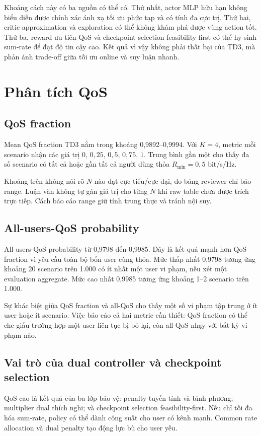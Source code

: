 Khoảng cách này có ba nguồn có thể có. Thứ nhất, actor MLP hữu hạn không biểu diễn được chính xác ánh xạ tối ưu phức tạp và có tính đa cực trị. Thứ hai, critic approximation và exploration có thể không khám phá được vùng action tốt. Thứ ba, reward ưu tiên QoS và checkpoint selection feasibility-first có thể hy sinh sum-rate để đạt độ tin cậy cao. Kết quả vì vậy không phải thất bại của TD3, mà phản ánh trade-off giữa tối ưu online và suy luận nhanh.

\section{Phân tích QoS}
\subsection{QoS fraction}
Mean QoS fraction TD3 nằm trong khoảng 0,9892--0,9994. Với $K=4$, metric mỗi scenario nhận các giá trị $0$, $0,25$, $0,5$, $0,75$, $1$. Trung bình gần một cho thấy đa số scenario có tất cả hoặc gần tất cả người dùng thỏa $R_{\min}=0,5$ bit/s/Hz.

Khoảng trên không nói rõ $N$ nào đạt cực tiểu/cực đại, do bảng reviewer chỉ báo range. Luận văn không tự gán giá trị cho từng $N$ khi raw table chưa được trích trực tiếp. Cách báo cáo range giữ tính trung thực và tránh nội suy.

\subsection{All-users-QoS probability}
All-users-QoS probability từ 0,9798 đến 0,9985. Đây là kết quả mạnh hơn QoS fraction vì yêu cầu toàn bộ bốn user cùng thỏa. Mức thấp nhất 0,9798 tương ứng khoảng 20 scenario trên 1.000 có ít nhất một user vi phạm, nếu xét một evaluation aggregate. Mức cao nhất 0,9985 tương ứng khoảng 1--2 scenario trên 1.000.

Sự khác biệt giữa QoS fraction và all-QoS cho thấy một số vi phạm tập trung ở ít user hoặc ít scenario. Việc báo cáo cả hai metric cần thiết: QoS fraction có thể che giấu trường hợp một user liên tục bị bỏ lại, còn all-QoS nhạy với bất kỳ vi phạm nào.

\subsection{Vai trò của dual controller và checkpoint selection}
QoS cao là kết quả của ba lớp bảo vệ: penalty tuyến tính và bình phương; multiplier dual thích nghi; và checkpoint selection feasibility-first. Nếu chỉ tối đa hóa sum-rate, policy có thể dành công suất cho user có kênh mạnh. Common rate allocation và dual penalty tạo động lực bù cho user yếu.

